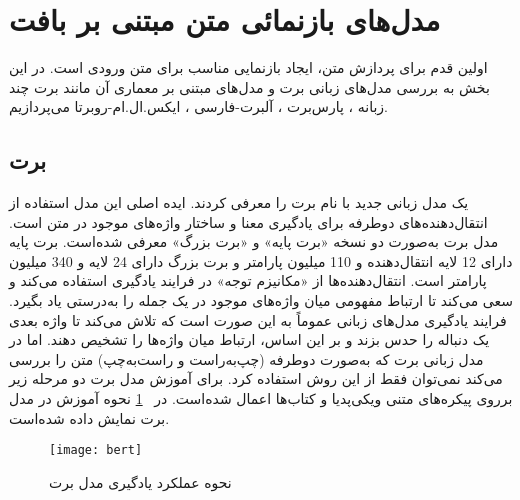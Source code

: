 
\section{مدل‌های بازنمائی متن مبتنی بر بافت}
\label{section.pretrained_models}
اولین قدم برای پردازش متن، ایجاد بازنمایی مناسب برای متن ورودی است. در این بخش به بررسی مدل‌های زبانی برت \citep{devlin2018bert} و مدل‌های مبتنی بر معماری آن مانند برت چند زبانه ، پارس‌برت  \citep{ParsBERT}، آلبرت‌-فارسی  \citep{ALBERTPersian}، ایکس.ال.ام-روبرتا  \citep{conneau2019unsupervised} می‌پردازیم.

\subsection{برت}
\label{section.bert}
\citet{devlin2018bert} 
یک مدل زبانی جدید با نام برت را معرفی کردند. ایده اصلی این مدل استفاده از انتقال‌دهنده‌های‌ دوطرفه برای یادگیری معنا و ساختار واژه‌های موجود در متن است. مدل برت به‌صورت دو نسخه «برت پایه» و «برت بزرگ» معرفی شده‌است. برت پایه دارای 12 لایه انتقال‌دهنده و  110 میلیون پارامتر و برت بزرگ دارای  24 لایه و 340 میلیون پارامتر است. انتقال‌دهنده‌ها از «مکانیزم توجه» در فرایند یادگیری استفاده می‌کند و سعی می‌کند تا ارتباط مفهومی میان واژه‌های موجود در یک جمله را به‌درستی یاد بگیرد. فرایند یادگیری مدل‌های زبانی عموماً به این صورت است که تلاش می‌کند تا واژه بعدی یک دنباله را حدس بزند و بر این اساس، ارتباط میان واژه‌ها را تشخیص دهند. اما در مدل زبانی برت که به‌صورت دوطرفه (چپ‌به‌راست و راست‌به‌چپ) متن را بررسی می‌کند نمی‌توان فقط از این روش استفاده کرد. برای آموزش مدل برت دو مرحله زیر برروی پیکره‌های متنی ویکی‌پدیا و کتاب‌ها اعمال شده‌است. 
 در \figurename~\ref{fig.BERT} نحوه آموزش در مدل برت نمایش داده شده‌است.

\begin{figure}[!h]
\texttt{[image: bert]}
\centering
\caption{ نحوه عملکرد یادگیری مدل برت \citep{devlin2018bert}}
\label{fig.BERT}
\end{figure}

